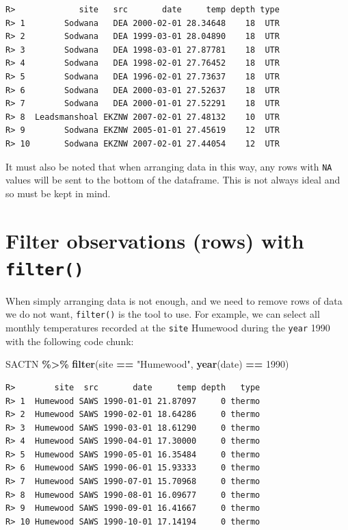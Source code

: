 \documentclass[
]{book}
\newenvironment{Shaded}{\begin{snugshade}}{\end{snugshade}}
\newcommand{\DecValTok}[1]{\textcolor[rgb]{0.00,0.00,0.81}{#1}}
\newcommand{\KeywordTok}[1]{\textcolor[rgb]{0.13,0.29,0.53}{\textbf{#1}}}
\newcommand{\NormalTok}[1]{#1}
\newcommand{\OperatorTok}[1]{\textcolor[rgb]{0.81,0.36,0.00}{\textbf{#1}}}
\newcommand{\StringTok}[1]{\textcolor[rgb]{0.31,0.60,0.02}{#1}}
\begin{document}
\begin{verbatim}
R>             site   src       date     temp depth type
R> 1        Sodwana   DEA 2000-02-01 28.34648    18  UTR
R> 2        Sodwana   DEA 1999-03-01 28.04890    18  UTR
R> 3        Sodwana   DEA 1998-03-01 27.87781    18  UTR
R> 4        Sodwana   DEA 1998-02-01 27.76452    18  UTR
R> 5        Sodwana   DEA 1996-02-01 27.73637    18  UTR
R> 6        Sodwana   DEA 2000-03-01 27.52637    18  UTR
R> 7        Sodwana   DEA 2000-01-01 27.52291    18  UTR
R> 8  Leadsmanshoal EKZNW 2007-02-01 27.48132    10  UTR
R> 9        Sodwana EKZNW 2005-01-01 27.45619    12  UTR
R> 10       Sodwana EKZNW 2007-02-01 27.44054    12  UTR
\end{verbatim}

It must also be noted that when arranging data in this way, any rows with \texttt{NA} values will be sent to the bottom of the dataframe. This is not always ideal and so must be kept in mind.

\hypertarget{filter-observations-rows-with-filter}{%
\section{\texorpdfstring{Filter observations (rows) with \texttt{filter()}}{Filter observations (rows) with filter()}}\label{filter-observations-rows-with-filter}}

When simply arranging data is not enough, and we need to remove rows of data we do not want, \texttt{filter()} is the tool to use. For example, we can select all monthly temperatures recorded at the \texttt{site} Humewood during the \texttt{year} 1990 with the following code chunk:

\begin{Shaded}
\begin{Highlighting}[]
\NormalTok{SACTN }\OperatorTok{\%>\%}\StringTok{ }
\StringTok{  }\KeywordTok{filter}\NormalTok{(site }\OperatorTok{==}\StringTok{ "Humewood"}\NormalTok{, }\KeywordTok{year}\NormalTok{(date) }\OperatorTok{==}\StringTok{ }\DecValTok{1990}\NormalTok{)}
\end{Highlighting}
\end{Shaded}

\begin{verbatim}
R>        site  src       date     temp depth   type
R> 1  Humewood SAWS 1990-01-01 21.87097     0 thermo
R> 2  Humewood SAWS 1990-02-01 18.64286     0 thermo
R> 3  Humewood SAWS 1990-03-01 18.61290     0 thermo
R> 4  Humewood SAWS 1990-04-01 17.30000     0 thermo
R> 5  Humewood SAWS 1990-05-01 16.35484     0 thermo
R> 6  Humewood SAWS 1990-06-01 15.93333     0 thermo
R> 7  Humewood SAWS 1990-07-01 15.70968     0 thermo
R> 8  Humewood SAWS 1990-08-01 16.09677     0 thermo
R> 9  Humewood SAWS 1990-09-01 16.41667     0 thermo
R> 10 Humewood SAWS 1990-10-01 17.14194     0 thermo
\end{verbatim}
\end{document}
